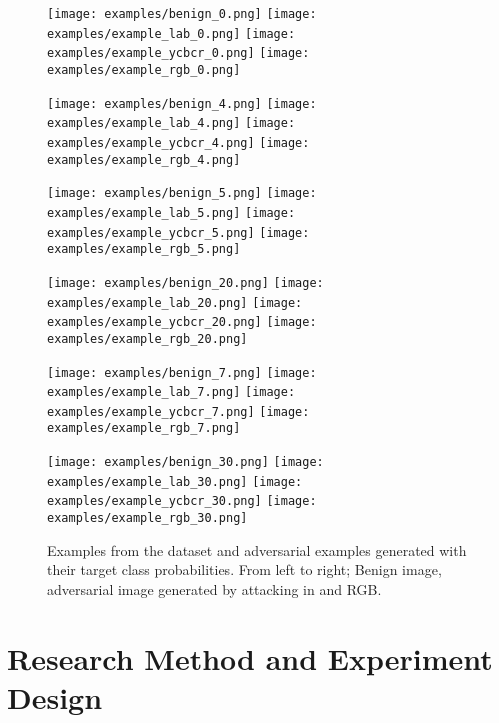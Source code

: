 


\begin{figure}[h]
    \texttt{[image: examples/benign\_0.png]}
    \texttt{[image: examples/example\_lab\_0.png]}
    \texttt{[image: examples/example\_ycbcr\_0.png]}
    \texttt{[image: examples/example\_rgb\_0.png]}

    \texttt{[image: examples/benign\_4.png]}
    \texttt{[image: examples/example\_lab\_4.png]}
    \texttt{[image: examples/example\_ycbcr\_4.png]}
    \texttt{[image: examples/example\_rgb\_4.png]}

    \texttt{[image: examples/benign\_5.png]}
    \texttt{[image: examples/example\_lab\_5.png]}
    \texttt{[image: examples/example\_ycbcr\_5.png]}
    \texttt{[image: examples/example\_rgb\_5.png]}

    \texttt{[image: examples/benign\_20.png]}
    \texttt{[image: examples/example\_lab\_20.png]}
    \texttt{[image: examples/example\_ycbcr\_20.png]}
    \texttt{[image: examples/example\_rgb\_20.png]}

    \texttt{[image: examples/benign\_7.png]}
    \texttt{[image: examples/example\_lab\_7.png]}
    \texttt{[image: examples/example\_ycbcr\_7.png]}
    \texttt{[image: examples/example\_rgb\_7.png]}

    \texttt{[image: examples/benign\_30.png]}
    \texttt{[image: examples/example\_lab\_30.png]}
    \texttt{[image: examples/example\_ycbcr\_30.png]}
    \texttt{[image: examples/example\_rgb\_30.png]}


    \caption{Examples from the dataset and adversarial examples generated with their target class probabilities. From left to right; Benign image, adversarial image generated by attacking in  and RGB. }\label{fig:visualprob}
\end{figure}
\section{Research Method and Experiment Design}